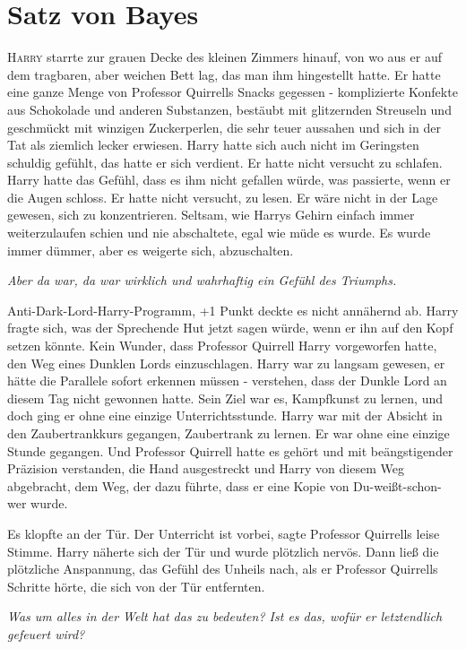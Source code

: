 \chapter{Satz von Bayes}

\lettrine{H}{arry} starrte zur grauen Decke des kleinen Zimmers hinauf, von wo
aus er auf dem tragbaren, aber weichen Bett lag, das man ihm hingestellt hatte.
Er hatte eine ganze Menge von Professor Quirrells Snacks gegessen - komplizierte
Konfekte aus Schokolade und anderen Substanzen, bestäubt mit glitzernden
Streuseln und geschmückt mit winzigen Zuckerperlen, die sehr teuer aussahen und
sich in der Tat als ziemlich lecker erwiesen. Harry hatte sich auch nicht im
Geringsten schuldig gefühlt, das hatte er sich verdient. Er hatte nicht versucht
zu schlafen. Harry hatte das Gefühl, dass es ihm nicht gefallen würde, was
passierte, wenn er die Augen schloss. Er hatte nicht versucht, zu lesen. Er wäre
nicht in der Lage gewesen, sich zu konzentrieren. Seltsam, wie Harrys Gehirn
einfach immer weiterzulaufen schien und nie abschaltete, egal wie müde es wurde.
Es wurde immer dümmer, aber es weigerte sich, abzuschalten.

\emph{Aber da war, da war wirklich und wahrhaftig ein Gefühl des Triumphs.}

Anti-Dark-Lord-Harry-Programm, +1 Punkt deckte es nicht annähernd ab. Harry
fragte sich, was der Sprechende Hut jetzt sagen würde, wenn er ihn auf den Kopf
setzen könnte. Kein Wunder, dass Professor Quirrell Harry vorgeworfen hatte, den
Weg eines Dunklen Lords einzuschlagen. Harry war zu langsam gewesen, er hätte
die Parallele sofort erkennen müssen - verstehen, dass der Dunkle Lord an diesem
Tag nicht gewonnen hatte. Sein Ziel war es, Kampfkunst zu lernen, und doch ging
er ohne eine einzige Unterrichtsstunde. Harry war mit der Absicht in den
Zaubertrankkurs gegangen, Zaubertrank zu lernen. Er war ohne eine einzige Stunde
gegangen. Und Professor Quirrell hatte es gehört und mit beängstigender
Präzision verstanden, die Hand ausgestreckt und Harry von diesem Weg abgebracht,
dem Weg, der dazu führte, dass er eine Kopie von Du-weißt-schon-wer wurde.

Es klopfte an der Tür. \glqq{}Der Unterricht ist vorbei\grqq{}, sagte Professor
Quirrells leise Stimme. Harry näherte sich der Tür und wurde plötzlich nervös.
Dann ließ die plötzliche Anspannung, das Gefühl des Unheils nach, als er
Professor Quirrells Schritte hörte, die sich von der Tür entfernten.

\emph{Was um alles in der Welt hat das zu bedeuten? Ist es das, wofür er
letztendlich gefeuert wird?}

